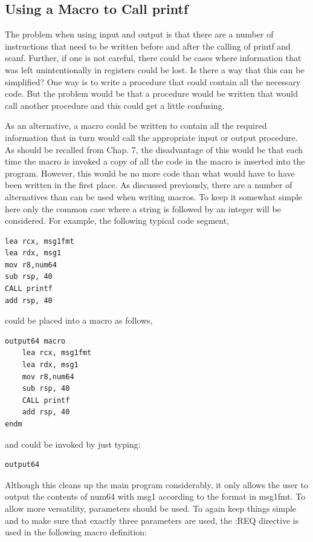 \documentclass[10pt]{book}
\begin{document}
\subsection{Using a Macro to Call printf}
The problem when using input and output is that there are a number of instructions that need to be written before and after the calling of printf and scanf. Further, if one is not careful, there could be cases where information that was left unintentionally in registers could be lost. Is there a way that this can be simplified? One way is to write a procedure that could contain all the necessary code. But the problem would be that a procedure would be written that would call another procedure and this could get a little confusing.

As an alternative, a macro could be written to contain all the required information that in turn would call the appropriate input or output procedure. As should be recalled from Chap. 7, the disadvantage of this would be that each time the macro is invoked a copy of all the code in the macro is inserted into the program. However, this would be no more code than what would have to have been written in the first place. As discussed previously, there are a number of alternatives than can be used when writing macros. To keep it somewhat simple here only the common case where a string is followed by an integer will be considered. For example, the following typical code segment,

\begin{verbatim}
lea rcx, msg1fmt
lea rdx, msg1
mov r8,num64
sub rsp, 40
CALL printf
add rsp, 40
\end{verbatim}

could be placed into a macro as follows,

\begin{verbatim}
output64 macro
    lea rcx, msg1fmt
    lea rdx, msg1
    mov r8,num64
    sub rsp, 40
    CALL printf
    add rsp, 40
endm
\end{verbatim}

and could be invoked by just typing:

\begin{verbatim}
output64
\end{verbatim}

Although this cleans up the main program considerably, it only allows the user to output the contents of num64 with msg1 according to the format in msg1fmt. To allow more versatility, parameters should be used. To again keep things simple and to make sure that exactly three parameters are used, the :REQ directive is used in the following macro definition:
\end{document}
